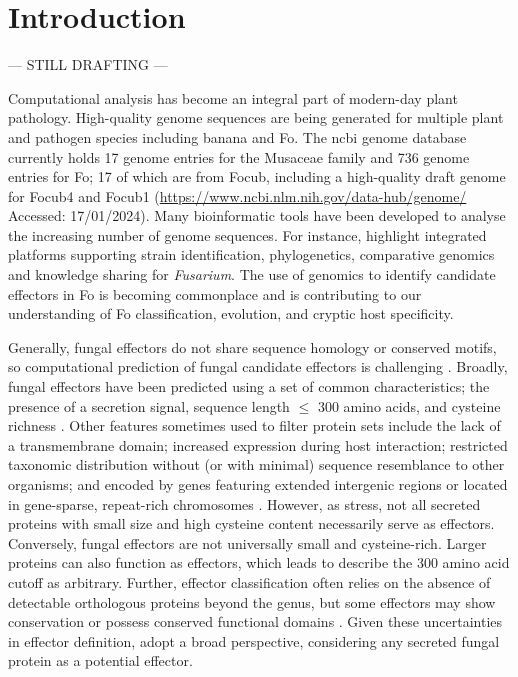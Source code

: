 \section{Introduction}

--- STILL DRAFTING ---

Computational analysis has become an integral part of modern-day plant pathology. High-quality genome sequences are being generated for multiple plant and pathogen species including banana and \ac{Fo}. The \ac{ncbi} genome database currently holds 17 genome entries for the Musaceae family and 736 genome entries for \ac{Fo}; 17 of which are from \ac{Focub}, including a high-quality draft genome for \ac{Focub4} \parencite{Warmington2019} and \ac{Focub1} \parencite{Asai2019} (\href{https://www.ncbi.nlm.nih.gov/data-hub/genome/}{https://www.ncbi.nlm.nih.gov/data-hub/genome/} Accessed: 17/01/2024). Many bioinformatic tools have been developed to analyse the increasing number of genome sequences. For instance, \textcite{Park2010} highlight integrated platforms supporting strain identification, phylogenetics, comparative genomics and knowledge sharing for \textit{Fusarium}. The use of genomics to identify candidate effectors in \ac{Fo} is becoming commonplace and is contributing to our understanding of \ac{Fo} classification, evolution, and cryptic host specificity. 

Generally, fungal effectors do not share sequence homology or conserved motifs, so computational prediction of fungal candidate effectors is challenging \parencite{Sperschneider2022, Todd2022}. Broadly, fungal effectors have been predicted using a set of common characteristics; the presence of a secretion signal, sequence length $\leq$ 300 amino acids, and cysteine richness \parencite{Sperschneider2015}. Other features sometimes used to filter protein sets include the lack of a transmembrane domain; increased expression during host interaction; restricted taxonomic distribution without (or with minimal) sequence resemblance to other organisms; and encoded by genes featuring extended intergenic regions or located in gene-sparse, repeat-rich chromosomes \parencite{Dalio2018, Todd2022}. However, as \textcite{LoPresti2015, Sperschneider2015} stress, not all secreted proteins with small size and high cysteine content necessarily serve as effectors. Conversely, fungal effectors are not universally small and cysteine-rich. Larger proteins can also function as effectors, which leads \textcite{LoPresti2015} to describe the 300 amino acid cutoff as arbitrary. Further, effector classification often relies on the absence of detectable orthologous proteins beyond the genus, but some effectors may show conservation or possess conserved functional domains \parencite{Jonge2010, Djamei2011, Mentlak2012}. Given these uncertainties in effector definition, \textcite{LoPresti2015} adopt a broad perspective, considering any secreted fungal protein as a potential effector. 

